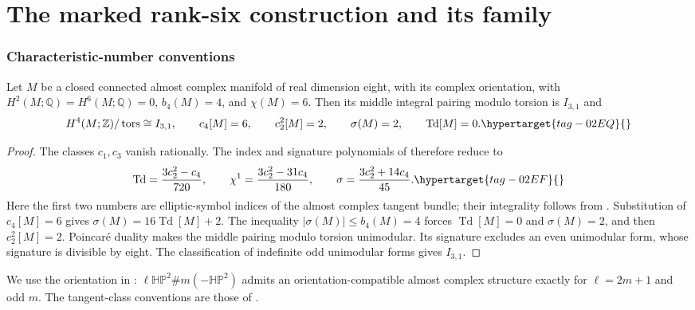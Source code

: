 \part{The marked rank-six construction and its family}
\section{Characteristic-number conventions}\label{pub:V:sec-characteristic-conventions}
\begin{proposition}
\hypertarget{tag-034M}{}\label{sec:V-known-inputs}
Let $M$ be a closed connected almost complex manifold of real dimension
eight, with its complex orientation, with $H^2(M;\mathbb Q)=
H^6(M;\mathbb Q)=0$, $b_4(M)=4$, and $\chi(M)=6$.
Then its middle integral pairing modulo torsion is $I_{3,1}$ and
\begin{equation}
 H^4(M;\mathbb Z)/\operatorname{tors}\cong I_{3,1},\qquad
 c_4[M]=6,\qquad c_2^2[M]=2,\qquad
 \sigma(M)=2,\qquad\operatorname{Td}[M]=0.
 \hypertarget{tag-02EQ}{}\label{maps:eq:F.2}
\end{equation}
\end{proposition}
\begin{proof}
The classes $c_1,c_3$ vanish rationally. The index and signature
polynomials of \cite[equations~(1.2)--(1.4), pp.~3--4]{ffEsoleKang}
therefore reduce to
\begin{equation}
 \operatorname{Td}=\frac{3c_2^2-c_4}{720},\qquad
 \chi^1=\frac{3c_2^2-31c_4}{180},\qquad
 \sigma=\frac{3c_2^2+14c_4}{45}.
 \hypertarget{tag-02EF}{}\label{maps:eq:F.1}
\end{equation}
Here the first two numbers are elliptic-symbol indices of the
almost complex tangent bundle; their integrality follows from
\cite[Theorem~24.5.4 and its corollary, p.~184]{HirzebruchTopologicalMethods}.
Substitution of $c_4[M]=6$ gives
$\sigma(M)=16\operatorname{Td}[M]+2$.
The inequality $|\sigma(M)|\le b_4(M)=4$ forces
$\operatorname{Td}[M]=0$ and $\sigma(M)=2$, and then $c_2^2[M]=2$.
Poincar\'e duality makes the middle pairing modulo torsion
unimodular. Its signature excludes an even unimodular form,
whose signature is divisible by eight. The classification of
indefinite odd unimodular forms
\cite[Theorem~2.2.1, p.~61]{ffPetersSterk} gives $I_{3,1}$.
\end{proof}

\begin{remark}
\hypertarget{tag-PV06}{}\label{pub:V:mandal-convention}
We use the orientation in
\cite[Corollary~1.4, p.~4, and its proof in \S5]{ffMandal}:
$\ell\mathbb{HP}^2\#m(-\mathbb{HP}^2)$ admits an
orientation-compatible almost complex structure exactly for
$\ell=2m+1$ and odd $m$.
The tangent-class conventions are those of
\cite[Lemma~2.1, p.~5, and Theorem~2.4, p.~7]{ffMandal}.
\end{remark}

